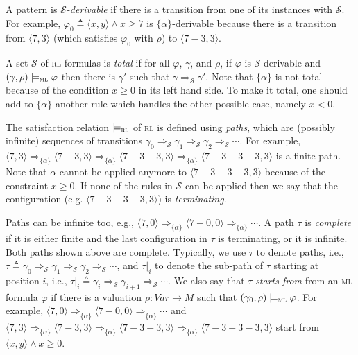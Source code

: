 \documentclass[conference]{IEEEtran}
\newcommand{\M}{\mathit{M}}
\newcommand{\eqbydef}{\triangleq}
\renewcommand{\S}{\mathcal{S}}
\newcommand{\tran}[2]{\Ra^{\!#1}_{\!#2}}
\newcommand{\Ra}{\Rightarrow}
\newcommand{\Var}{\mathit{Var}}
\newcommand{\ML}{\textsc{ml}\xspace}
\newcommand{\RL}{\textsc{rl}\xspace}
\newcommand{\modelsml}{\models_\ML}
\newcommand{\modelsrl}{\models_\RL}
\begin{document}
A pattern is \emph{$\S$-derivable} if there is a transition from one of its instances with $\S$. 
For example, $\varphi_0 \eqbydef \langle x , y \rangle \land x \geq 7$ is $\{\alpha\}$-derivable because there is a transition from $\langle 7, 3\rangle$ (which satisfies $\varphi_0$ with $\rho$) to $\langle 7 - 3, 3\rangle$. 



A set $\S$ of \RL formulas is \emph{total} if for all $\varphi$, $\gamma$, and $\rho$, if $\varphi$ is $\S$-derivable and $(\gamma, \rho) \modelsml\varphi$ then there is $\gamma'$ such that $\gamma \tran{}{\S} \gamma'$. 
Note that $\{ \alpha \}$ is not total because of the condition $x \geq 0$ in its left hand side. 
To make it total, one should add to $\{ \alpha \}$ another rule which handles the other possible case, namely $x < 0$.

The satisfaction relation $\modelsrl$ of \RL is defined using \emph{paths}, which are (possibly infinite)
sequences of transitions $\gamma_0 \tran{}{\S} \gamma_1 \tran{}{\S} \gamma_2 \tran{}{\S} \cdots$.
For example, $\langle 7, 3\rangle \tran{}{\{\alpha\}} \langle 7 - 3, 3\rangle \tran{}{\{\alpha\}} \langle 7 - 3 - 3 , 3\rangle \tran{}{\{\alpha\}} \langle 7 - 3 - 3 - 3 , 3\rangle $ is a finite path.
Note that $\alpha$ cannot be applied anymore to $\langle 7 - 3 - 3 - 3 , 3\rangle$ because of the constraint $x \geq 0$.
If none of the rules in $\S$ can be applied then we say that the configuration (e.g.  $\langle 7 - 3 - 3 - 3 , 3\rangle$) is \emph{terminating}.

Paths can be infinite too, e.g., $\langle 7, 0\rangle \tran{}{\{\alpha\}} \langle 7 - 0, 0\rangle \tran{}{\{\alpha\}} \cdots$.
A path $\tau$ is \emph{complete} if it is either finite and the last configuration in $\tau$ is terminating, or it is infinite.
Both paths shown above are complete.
Typically, we use $\tau$ to denote paths, i.e., $\tau \eqbydef \gamma_0 \tran{}{\S} \gamma_1 \tran{}{\S} \gamma_2 \tran{}{\S} \cdots$, and $\tau|_i$ to denote the sub-path of $\tau$ starting at position $i$, i.e., $\tau|_i \eqbydef \gamma_i \tran{}{\S} \gamma_{i+1} \tran{}{\S} \cdots$.
We also say that $\tau$ \emph{starts from} from an \ML formula $\varphi$ if there is a valuation $\rho:\Var \to\M$ such that $(\gamma_0, \rho) \modelsml \varphi$.
For example, $\langle 7, 0\rangle \tran{}{\{\alpha\}} \langle 7 - 0, 0\rangle \tran{}{\{\alpha\}} \cdots$ and $\langle 7, 3\rangle \tran{}{\{\alpha\}} \langle 7 - 3, 3\rangle \tran{}{\{\alpha\}} \langle 7 - 3 - 3 , 3\rangle \tran{}{\{\alpha\}} \langle 7 - 3 - 3 - 3 , 3\rangle $ start from  $\langle x , y \rangle \land x \geq 0$.
\end{document}

